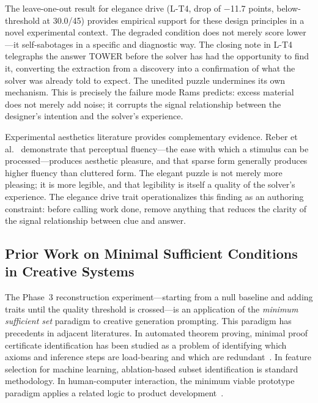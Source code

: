The leave-one-out result for elegance drive (L-T4, drop of $-$11.7 points, below-threshold at 30.0/45) provides empirical support for these design principles in a novel experimental context. The degraded condition does not merely score lower---it self-sabotages in a specific and diagnostic way. The closing note in L-T4 telegraphs the answer TOWER before the solver has had the opportunity to find it, converting the extraction from a discovery into a confirmation of what the solver was already told to expect. The unedited puzzle undermines its own mechanism. This is precisely the failure mode Rams predicts: excess material does not merely add noise; it corrupts the signal relationship between the designer's intention and the solver's experience.

Experimental aesthetics literature provides complementary evidence. Reber et al.~\cite{reber2004processing} demonstrate that perceptual fluency---the ease with which a stimulus can be processed---produces aesthetic pleasure, and that sparse form generally produces higher fluency than cluttered form. The elegant puzzle is not merely more pleasing; it is more legible, and that legibility is itself a quality of the solver's experience. The elegance drive trait operationalizes this finding as an authoring constraint: before calling work done, remove anything that reduces the clarity of the signal relationship between clue and answer.

\subsection{Prior Work on Minimal Sufficient Conditions in Creative Systems}

The Phase~3 reconstruction experiment---starting from a null baseline and adding traits until the quality threshold is crossed---is an application of the \emph{minimum sufficient set} paradigm to creative generation prompting. This paradigm has precedents in adjacent literatures. In automated theorem proving, minimal proof certificate identification has been studied as a problem of identifying which axioms and inference steps are load-bearing and which are redundant~\cite{harrison2009minproof}. In feature selection for machine learning, ablation-based subset identification is standard methodology. In human-computer interaction, the minimum viable prototype paradigm applies a related logic to product development~\cite{ries2011lean}.


